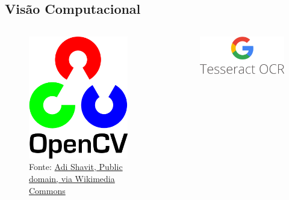 \subsection{Visão Computacional}
\begin{frame}
    \begin{columns}
        \begin{column}{0.5\textwidth}
            \begin{figure}
                \centering
                \includegraphics[width=0.9\textwidth]{../pictures/OpenCV_Logo_with_text.png}
                \caption*{Fonte: \href{https://commons.wikimedia.org/wiki/File:OpenCV_Logo_with_text.png}{Adi Shavit, Public domain, via Wikimedia Commons}}
            \end{figure}
        \end{column}
        \begin{column}{0.5\textwidth}
            \begin{figure}
                \centering
                \includegraphics[width=1\textwidth]{../pictures/Tesseract_OCR_logo_(Google).png}

\end{figure}
\end{column}
\end{columns}
\end{frame}

